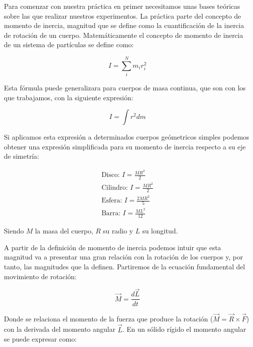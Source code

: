 \documentclass[a4paper,12pt,titlepage]{report}
\begin{document}
Para comenzar con nuestra práctica en primer necesitamos unas bases teóricas sobre las que realizar nuestros experimentos. La práctica parte del concepto de momento de inercia, magnitud que se define como la cuantificación de la inercia de rotación de un cuerpo. Matemáticamente el concepto de momento de inercia de un sistema de partículas se define como:

\begin{equation}
    I = \sum_i^N m_i r_i^2
\end{equation}

Esta fórmula puede generalizara para cuerpos de masa continua, que son con los que trabajamos, con la siguiente expresión:

\begin{equation}
    I = \int r^2 dm
    \label{Def MI}
\end{equation}

Si aplicamos esta expresión a determinados cuerpos geómetricos simples podemos obtener una expresión simplificada para su momento de inercia respecto a su eje de simetría:

\begin{equation}
    \begin{gathered}
        \text{Disco: } I=\frac{MR^2}{2} \\
        \text{Cilindro: } I = \frac{MR^2}{2}\\
        \text{Esfera: } I = \frac{2MR^2}{5} \\
        \text{Barra: } I = \frac{ML^2}{12}
        \label{MI cuerpos geometricos}
    \end{gathered}
\end{equation}

Siendo $M$ la masa del cuerpo, $R$ su radio y $L$ su longitud.
\par A partir de la definición de momento de inercia podemos intuir que esta magnitud va a presentar una gran relación con la rotación de los cuerpos y, por tanto, las magnitudes que la definen. Partiremos de la ecuación fundamental del movimiento de rotación:

\begin{equation}
    \vec{M} = \frac{d\vec{L}}{dt}
\end{equation}

Donde se relaciona el momento de la fuerza que produce la rotación ($\vec{M}=\vec{R}\times \vec{F}$) con la derivada del momento angular $\vec{L}$. En un sólido rígido el momento angular se puede expresar como:
\end{document}
